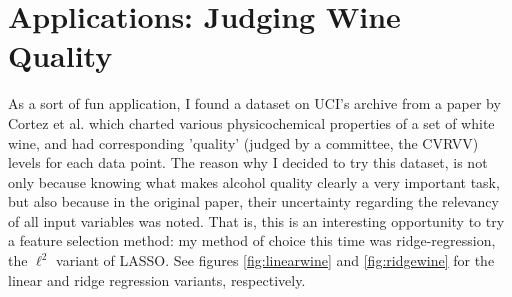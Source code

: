\section{Applications: Judging Wine Quality}

As a sort of fun application, I found a dataset on UCI's archive from a paper by
Cortez et al. \cite{2009CCAMR} which charted various physicochemical properties
of a set of white wine, and had corresponding 'quality' (judged by a committee,
the CVRVV) levels for each data point. The reason why I decided to try this
dataset, is not only because knowing what makes alcohol quality clearly
a very important task, but also because in the original paper, their uncertainty
regarding the relevancy of all input variables was noted. That is, this is an
interesting opportunity to try a feature selection method: my method of choice
this time was ridge-regression, the $\ell^2$ variant of LASSO. See figures
\ref{fig:linearwine} and \ref{fig:ridgewine} for the linear and ridge regression
variants, respectively.
